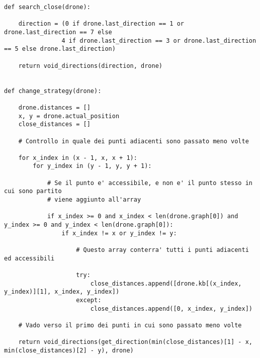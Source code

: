 \begin{verbatim}
def search_close(drone):

    direction = (0 if drone.last_direction == 1 or drone.last_direction == 7 else
                4 if drone.last_direction == 3 or drone.last_direction == 5 else drone.last_direction)

    return void_directions(direction, drone)


def change_strategy(drone):

    drone.distances = []
    x, y = drone.actual_position
    close_distances = []

    # Controllo in quale dei punti adiacenti sono passato meno volte

    for x_index in (x - 1, x, x + 1):
        for y_index in (y - 1, y, y + 1):

            # Se il punto e' accessibile, e non e' il punto stesso in cui sono partito
            # viene aggiunto all'array

            if x_index >= 0 and x_index < len(drone.graph[0]) and y_index >= 0 and y_index < len(drone.graph[0]):
                if x_index != x or y_index != y:

                    # Questo array conterra' tutti i punti adiacenti ed accessibili

                    try:
                        close_distances.append([drone.kb[(x_index, y_index)][1], x_index, y_index])
                    except:
                        close_distances.append([0, x_index, y_index])

    # Vado verso il primo dei punti in cui sono passato meno volte

    return void_directions(get_direction(min(close_distances)[1] - x, min(close_distances)[2] - y), drone)
\end{verbatim}
	
